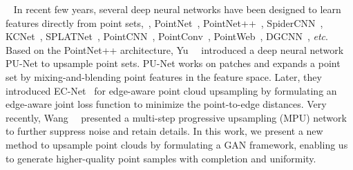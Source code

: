  \
In recent few years, several deep neural networks have been designed to learn features directly from point sets,~\eg, PointNet~\cite{qi2016pointnet}, PointNet++~\cite{qi2017pointnet++}, SpiderCNN~\cite{xu2018spidercnn}, KCNet~\cite{shen2018mining}, SPLATNet~\cite{su2018splatnet}, PointCNN~\cite{li2018pointcnn}, PointConv~\cite{hua2017pointwise}, PointWeb~\cite{zhao2019pointweb}, DGCNN~\cite{wang2018dynamic}, \emph{etc}.
Based on the PointNet++ architecture, Yu~\etal~\cite{yu2018pu} introduced a deep neural network PU-Net to upsample point sets.
PU-Net works on patches and expands a point set by mixing-and-blending point features in the feature space.
Later, they introduced EC-Net~\cite{yu2018ec} for edge-aware point cloud upsampling by formulating an edge-aware joint loss function to minimize the point-to-edge distances.
%
Very recently, Wang~\etal~\cite{yifan2018patch} presented a multi-step progressive upsampling (MPU) network to further suppress noise and retain details.
%
In this work, we present a new method to upsample point clouds by formulating a GAN framework, enabling us to generate higher-quality point samples with completion and uniformity.






